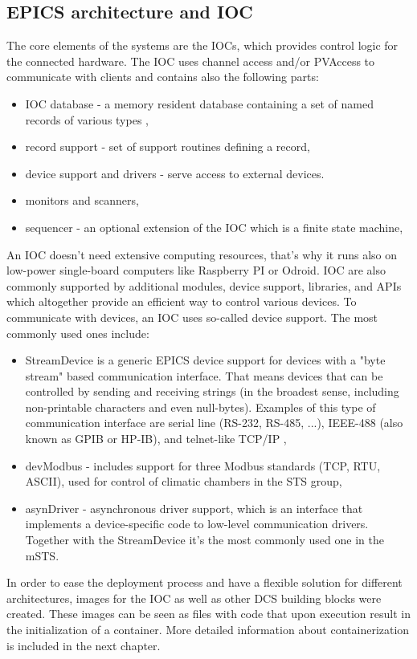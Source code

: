 \subsection{EPICS architecture and IOC}
The core elements of the systems are the \glspl{IOC}, which provides control logic for the connected hardware. The \gls{IOC} uses channel access and/or PVAccess to communicate with clients and contains also the following parts\cite{IOC}:
\begin{itemize}
    \item \gls{IOC} database -  a memory resident database containing a set of named records of various types \cite{IOC2},
    \item record support - set of support routines defining a record,
    \item device support and drivers - serve access to external devices.
    \item monitors and scanners,
    \item sequencer - an optional extension of the \gls{IOC} which is a finite state machine,
\end{itemize}
An \gls{IOC} doesn't need extensive computing resources, that's why it runs also on low-power single-board computers like Raspberry PI or Odroid. 
 \gls{IOC} are also commonly supported by additional modules, device support, libraries, and \glspl{API} which altogether provide an efficient way to control various devices.
To communicate with devices, an \gls{IOC} uses so-called device support. The most commonly used ones include:
\begin{itemize}
    \item StreamDevice is a generic EPICS device support for devices with a "byte stream" based communication interface. That means devices that can be controlled by sending and receiving strings (in the broadest sense, including non-printable characters and even null-bytes). Examples of this type of communication interface are serial line (RS-232, RS-485, ...), IEEE-488 (also known as GPIB or HP-IB), and telnet-like TCP/IP \cite{StreamDevice},
    \item devModbus \cite{modbus} - includes support for three Modbus standards (TCP, RTU, ASCII), used for control of climatic chambers in the \gls{STS} group,
    \item asynDriver \cite{asyn} - asynchronous driver support, which is an interface that implements a device-specific code to low-level communication drivers. Together with the StreamDevice it's the most commonly used one in the \gls{mSTS}. 
\end{itemize}

In order to ease the deployment process and have a flexible solution for different architectures, images for the \gls{IOC} as well as other \gls{DCS} building blocks were created. These images can be seen as files with code that upon execution result in the initialization of a container. More detailed information about containerization is included in the next chapter. 
 
